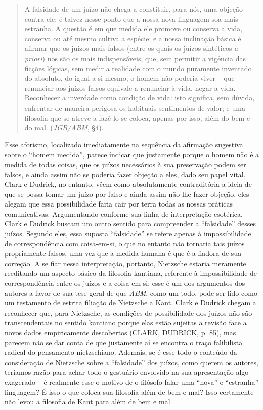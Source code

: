 \documentclass[
	12pt,				%
	openright,			%
	oneside,			%
	a4paper,			%
	english,			%
	french,				%
	spanish,			%
	brazil				%
	]{abntex2}
\begin{document}
\begin{quotation}
A falsidade de um juízo não chega a constituir, para nós, uma objeção contra ele; é talvez nesse ponto que a nossa nova linguagem soa mais estranha. A questão é em que medida ele promove ou conserva a vida, conserva ou até mesmo cultiva a espécie; e a nossa inclinação básica é afirmar que os juízos mais falsos (entre os quais os juízos sintéticos \textit{a priori}) nos são os mais indispensáveis, que, sem permitir a vigência das ficções lógicas, sem medir a realidade com o mundo puramente inventado do absoluto, do igual a si mesmo, o homem não poderia viver – que renunciar aos juízos falsos equivale a renunciar à vida, negar a vida. Reconhecer a inverdade como condição de vida: isto significa, sem dúvida, enfrentar de maneira perigosa os habituais sentimentos de valor; e uma filosofia que se atreve a fazê-lo se coloca, apenas por isso, além do bem e do mal. (\textit{JGB/ABM}, §4).
\end{quotation}

Esse aforismo, localizado imediatamente na sequência da afirmação sugestiva sobre o “homem medida”, parece indicar que justamente porque o homem não é a medida de todas coisas, que os juízos necessários à sua preservação podem ser falsos, e ainda assim não se poderia fazer objeção a eles, dado seu papel vital. Clark e Dudrick, no entanto, vêem como absolutamente contraditória a ideia de que se possa tomar um juízo por falso e ainda assim não lhe fazer objeção, eles alegam que essa possibilidade faria cair por terra todas as nossas práticas comunicativas. Argumentando conforme sua linha de interpretação esotérica, Clark e Dudrick buscam um outro sentido para compreender a “falsidade” desses juízos. Segundo eles, essa suposta “falsidade” se refere apenas à impossibilidade de correspondência com coisa-em-si, o que no entanto não tornaria tais juízos propriamente falsos, uma vez que a medida humana é que é a fiadora de sua correção. A se fiar nessa interpretação, portanto, Nietzsche estaria meramente reeditando um aspecto básico da filosofia kantiana, referente à impossibilidade de correspondência entre os juízos e a coisa-em-si; esse é um dos argumentos dos autores a favor de sua tese geral de que \textit{ABM}, como um todo, pode ser lido como um testamento de estrita filiação de Nietzsche a Kant. Clark e Dudrick chegam a reconhecer que, para Nietzsche, as condições de possibilidade dos juízos não são transcendentais no sentido kantiano porque elas estão sujeitas a revisão face a novos dados empiricamente descobertos (CLARK, DUDRICK, p. 85), mas parecem não se dar conta de que justamente aí se encontra o traço falibilista radical do pensamento nietzschiano. Ademais, se é esse todo o conteúdo da consideração de Nietzsche sobre a “falsidade” dos juízos, como querem os autores, teríamos razão para achar todo o gestuário envolvido na sua apresentação algo exagerado – é realmente esse o motivo de o filósofo falar uma “nova” e “estranha” linguagem? É isso o que coloca sua filosofia além de bem e mal? Isso certamente não levou a filosofia de Kant para além de bem e mal.
\end{document}
